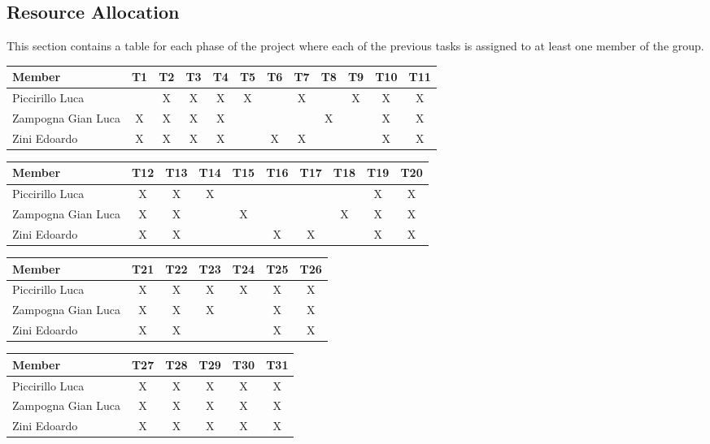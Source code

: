\newpage
\subsection{Resource Allocation}
This section contains a table for each phase of the project where each of the previous tasks is assigned to at least one member of the group.\\

\noindent
\begin{tabular}{| l | c | c | c | c | c | c | c | c | c | c | c |}
\hline
\textbf{Member} & \textbf{T1} & \textbf{T2} & \textbf{T3} & \textbf{T4} & \textbf{T5} & \textbf{T6} & \textbf{T7} & \textbf{T8} & \textbf{T9} & \textbf{T10} & \textbf{T11}\\
\hline
Piccirillo Luca     &   & X & X & X & X &   & X &   & X & X & X\\
\hline
Zampogna Gian Luca  & X & X & X & X &   &   &   & X &   & X & X\\
\hline
Zini Edoardo        & X & X & X & X &   & X & X &   &   & X & X\\
\hline
\end{tabular}

\bigskip

\noindent
\begin{tabular}{| l | c | c | c | c | c | c | c | c | c |}
\hline
\textbf{Member} & \textbf{T12} & \textbf{T13} & \textbf{T14} & \textbf{T15} & \textbf{T16} & \textbf{T17} & \textbf{T18} & \textbf{T19} & \textbf{T20}\\
\hline
Piccirillo Luca    & X & X & X &   &   &   &   & X & X\\
\hline
Zampogna Gian Luca & X & X &   & X &   &   & X & X & X\\
\hline
Zini Edoardo       & X & X &   &   & X & X &   & X & X\\
\hline
\end{tabular}

\bigskip

\noindent
\begin{tabular}{| l | c | c | c | c | c | c |}
\hline
\textbf{Member} & \textbf{T21} & \textbf{T22} & \textbf{T23} & \textbf{T24} & \textbf{T25} & \textbf{T26}\\
\hline
Piccirillo Luca    & X & X & X & X & X & X\\
\hline
Zampogna Gian Luca & X & X & X &   & X & X\\
\hline
Zini Edoardo       & X & X &   &   & X & X\\
\hline
\end{tabular}

\bigskip

\noindent
\begin{tabular}{| l | c | c | c | c | c |}
\hline
\textbf{Member} & \textbf{T27} & \textbf{T28} & \textbf{T29} & \textbf{T30} & \textbf{T31}\\
\hline
Piccirillo Luca     & X & X & X & X & X\\
\hline
Zampogna Gian Luca  & X & X & X & X & X\\
\hline
Zini Edoardo        & X & X & X & X & X\\
\hline
\end{tabular}